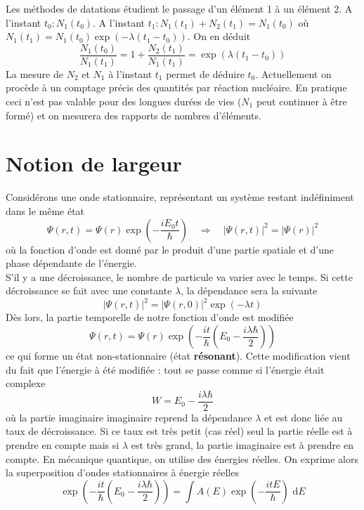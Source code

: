 Les méthodes de datations étudient le passage d'un élément 1 à un élément 2. A l'instant $t_0 : N_1(t_0)$. A 
l'instant $t_1 : N_1(t_1)+N_2(t_1)=N_1(t_0)$ où $N_1(t_1) = N_1(t_0)\exp(-\lambda(t_1-t_0))$. On en déduit
\begin{equation}
\frac{N_1(t_0)}{N_1(t_1)} = 1 +\frac{N_2(t_1)}{N_1(t_1)} = \exp(\lambda(t_1-t_0))
\end{equation}
La mesure de $N_2$ et $N_1$ à l'instant $t_1$ permet de déduire $t_0$. Actuellement on procède à un comptage
précis des quantités par réaction nucléaire. En pratique ceci n'est pas valable pour des longues durées de 
vies ($N_1$ peut continuer à être formé) et on mesurera des rapports de nombres d'éléments.

\section{Notion de largeur}
Considérons une onde stationnaire, représentant un système restant indéfiniment dans le même état
\begin{equation}
\Psi(r,t) = \Psi(r)\exp\left(-\frac{iE_0t}{\hbar}\right) \quad\Rightarrow\quad |\Psi(r,t)|^2 = |\Psi(r)|^2
\end{equation}
où la fonction d'onde est donné par le produit d'une partie spatiale et d'une phase dépendante de l'énergie.\\

S'il y a une décroissance, le nombre de particule va varier avec le temps. Si cette décroissance se fait avec une
constante $\lambda$, la dépendance sera la suivante
\begin{equation}
|\Psi(r,t)|^2 = |\Psi(r,0)|^2\exp(-\lambda t)
\end{equation}
Dès lors, la partie temporelle de notre fonction d'onde est modifiée 
\begin{equation}
\Psi(r,t) = \Psi(r)\exp\left(-\frac{it}{\hbar}\left(E_0-\frac{i\lambda\hbar}{2}\right)\right)
\end{equation}
ce qui forme un état non-stationnaire (état \textbf{résonant}). Cette modification vient du fait que l'énergie
à été modifiée : tout se passe comme si l'énergie était complexe
\begin{equation}
W = E_0-\frac{i\lambda\hbar}{2}
\end{equation}
où la partie imaginaire imaginaire reprend la dépendance $\lambda$ et est donc liée au taux de décroissance. Si
ce taux est très petit (cas réel) seul la partie réelle est à prendre en compte mais si $\lambda$ est très grand, 
la partie imaginaire est à prendre en compte. En mécanique quantique, on utilise des énergies réelles. On 
exprime alors la superposition d'ondes stationnaires à énergie réelles
\begin{equation}
\exp\left(-\frac{it}{\hbar}\left(E_0-\frac{i\lambda\hbar}{2}\right)\right) = \int A(E)\exp\left(
-\frac{itE}{\hbar}\right)\text{ d}E
\end{equation}

